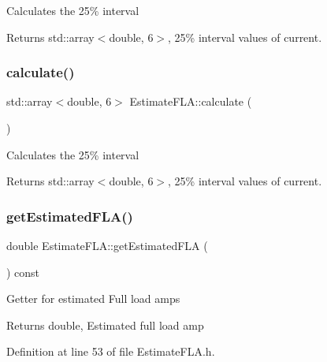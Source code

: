 Calculates the 25\% interval \begin{DoxyReturn}{Returns}
std\+::array$<$double, 6$>$, 25\% interval values of current. 
\end{DoxyReturn}
\mbox{\label{class_estimate_f_l_a_abb1ddcf8de5772322e2e75c8d041f740}} 
\subsubsection{\texorpdfstring{calculate()}{calculate()}\hspace{0.1cm}{\footnotesize\ttfamily [3/3]}}
{\footnotesize\ttfamily std\+::array$<$double, 6$>$ Estimate\+F\+L\+A\+::calculate (\begin{DoxyParamCaption}{ }\end{DoxyParamCaption})}

Calculates the 25\% interval \begin{DoxyReturn}{Returns}
std\+::array$<$double, 6$>$, 25\% interval values of current. 
\end{DoxyReturn}
\mbox{\label{class_estimate_f_l_a_adcb6eef313c8184f52b9ca038fbeddaa}} 
\subsubsection{\texorpdfstring{get\+Estimated\+F\+L\+A()}{getEstimatedFLA()}\hspace{0.1cm}{\footnotesize\ttfamily [1/3]}}
{\footnotesize\ttfamily double Estimate\+F\+L\+A\+::get\+Estimated\+F\+LA (\begin{DoxyParamCaption}{ }\end{DoxyParamCaption}) const\hspace{0.3cm}{\ttfamily [inline]}}

Getter for estimated Full load amps \begin{DoxyReturn}{Returns}
double, Estimated full load amp 
\end{DoxyReturn}


Definition at line 53 of file Estimate\+F\+L\+A.\+h.

\mbox{\label{class_estimate_f_l_a_adcb6eef313c8184f52b9ca038fbeddaa}} 
